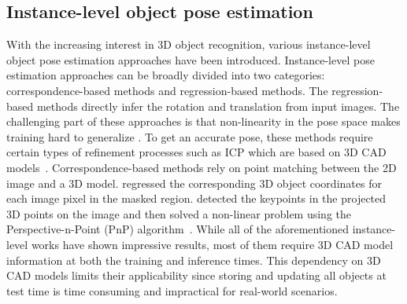\documentclass[letterpaper, 10 pt, journal, twoside]{IEEEtran}
\begin{document}
\subsection{Instance-level object pose estimation}
With the increasing interest in 3D object recognition, various instance-level object pose estimation approaches have been introduced.
Instance-level pose estimation approaches can be broadly divided into two categories: correspondence-based methods and regression-based methods. 
The regression-based methods directly infer the rotation and translation from input images.
The challenging part of these approaches is that non-linearity in the pose space makes training hard to generalize \cite{sattler2019understanding}.
To get an accurate pose, these methods require certain types of refinement processes such as ICP which are based on 3D CAD models~\cite{rusinkiewicz2001efficient}.
Correspondence-based methods rely on point matching between the 2D image and a 3D model.
\cite{park2019pix2pose, zakharov2019dpod, li2019cdpn} regressed the corresponding 3D object coordinates for each image pixel in the masked region.
\cite{peng2019pvnet, rad2017bb8_indirect, tekin2018real_indirect, tremblay2018deep} detected the keypoints in the projected 3D points on the image and then solved a non-linear problem using the Perspective-n-Point (PnP) algorithm~\cite{lepetit2009epnp}.
While all of the aforementioned instance-level works have shown impressive results, most of them require 3D CAD model information at both the training and inference times. 
This dependency on 3D CAD models limits their applicability since storing and updating all objects at test time is time consuming and impractical for real-world scenarios.
\end{document}
